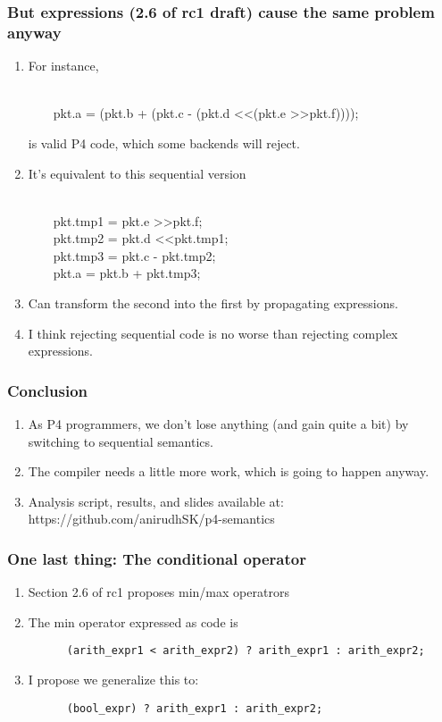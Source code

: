 \documentclass[aspectratio=169]{beamer}
\begin{document}
\begin{frame}[fragile]
  \frametitle{But expressions (2.6 of rc1 draft) cause the same problem anyway}
    \begin{enumerate}
    \item<1-> For instance,
      \begin{texttt} \\
      \ \ \ \ pkt.a = (pkt.b + (pkt.c - (pkt.d \textless\textless (pkt.e \textgreater\textgreater pkt.f)))); \\
      \end{texttt}
      is valid P4 code, which some backends will reject.
    \item<2-> It's equivalent to this sequential version
      \begin{texttt} \\
      \ \ \ \ pkt.tmp1 = pkt.e \textgreater\textgreater pkt.f; \\
      \ \ \ \ pkt.tmp2 = pkt.d \textless\textless pkt.tmp1; \\
      \ \ \ \ pkt.tmp3 = pkt.c - pkt.tmp2; \\
      \ \ \ \ pkt.a    = pkt.b + pkt.tmp3; \\
    \end{texttt}
   \item<3-> Can transform the second into the first by propagating expressions.
   \item<4-> I think rejecting sequential code is no worse than rejecting complex expressions.
  \end{enumerate}
\end{frame}

\begin{frame}[fragile]
  \frametitle{Conclusion}
  \begin{enumerate}
    \item<1-> As P4 programmers, we don't lose anything (and gain quite a bit) by switching to sequential semantics.
    \item<2-> The compiler needs a little more work, which is going to happen anyway.
    \item<3-> Analysis script, results, and slides available at: https://github.com/anirudhSK/p4-semantics
  \end{enumerate}
\end{frame}

\begin{frame}[fragile]
  \frametitle{One last thing: The conditional operator}
  \begin{enumerate}
    \item<1-> Section 2.6 of rc1 proposes min/max operatrors
    \item<2-> The min operator expressed as code is
      \begin{verbatim}
      (arith_expr1 < arith_expr2) ? arith_expr1 : arith_expr2;
      \end{verbatim}
    \item<3-> I propose we generalize this to:
      \begin{verbatim}
      (bool_expr) ? arith_expr1 : arith_expr2;
      \end{verbatim}
  \end{enumerate}
\end{frame}
\end{document}
